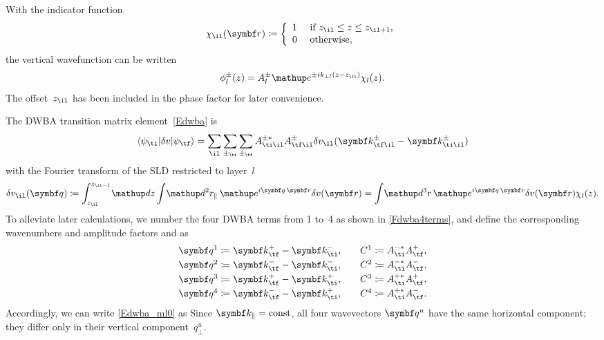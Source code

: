With the indicator function
%
%
\begin{equation}\label{Echildef}
  \chi_\il(\r)\coloneqq\left\{\begin{array}{ll}
  1&\text{~if $z_\il\le z \le z_{\il+1}$,}\\[.2ex]
  0&\text{~otherwise,} \end{array}\right.
\end{equation}
the vertical wavefunction can be written
\begin{equation}\label{Ephizwj}
  \phi^\pm_l(z)=A^\pm_l\e^{\pm ik_{\perp l}(z-z_\il)}\chi_l(z).
\end{equation}
%
The offset~$z_\il$ has been included in the phase factor for later convenience.

The DWBA transition matrix element~\cref{Edwba} is
%
\begin{equation}\label{Edwba_ml0}
  \bra \psi_\ti|\delta v|\psi_\tf\ket
  = \sum_{\il} \sum_{\pm_\ti} \sum_{\pm_\tf}
    A^{\pm *}_{\ti \il} A^\pm_{\tf \il}
     \delta v_\il(\k^\pm_{\tf \il}-\k^\pm_{\ti \il})
\end{equation}
with the Fourier transform of the SLD
restricted to layer~$l$
\begin{equation}\label{Echij}
  \delta v_\il(\v{q})
  \coloneqq  \int_{z_\il}^{z_{\il-1}}\!\d z \int\!\d^2r_\plll\, \e^{i\v{q}\,\r}\delta v(\r)
  = \int\!\d^3r\, \e^{i\v{q}\,\r}\delta v(\r) \chi_l(z).
\end{equation}
%
To alleviate later calculations,
we number the four DWBA terms from 1 to~4 as shown in \cref{Fdwba4terms},
and define the corresponding wavenumbers and amplitude factors and as
\begin{equation}\label{Eudef}
  \begin{array}{l@{\hspace{2em}}l}
    \q^1 \coloneqq  \k^+_\tf - \k^-_\ti,& C^1 \coloneqq  A^{-*}_\ti A^+_\tf, \\[.6ex]
    \q^2 \coloneqq  \k^-_\tf - \k^-_\ti,& C^2 \coloneqq  A^{-*}_\ti A^-_\tf, \\[.6ex]
    \q^3 \coloneqq  \k^+_\tf - \k^+_\ti,& C^3 \coloneqq  A^{+*}_\ti A^+_\tf, \\[.6ex]
    \q^4 \coloneqq  \k^-_\tf - \k^+_\ti,& C^4 \coloneqq  A^{+*}_\ti A^-_\tf.
  \end{array}
\end{equation}
Accordingly, we can write \cref{Edwba_ml0} as
Since $\k_\parallel=\text{const}$,
 all four wavevectors $\q^u$ have the same horizontal component;
they differ only in their vertical component~$q^u_\perp$.

